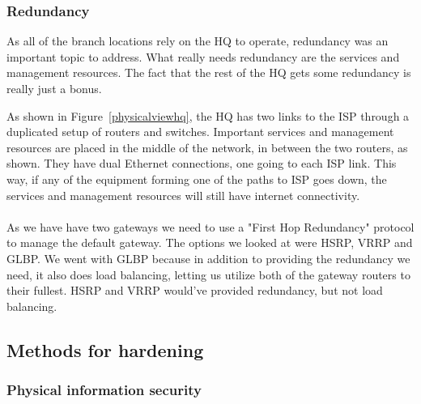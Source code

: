
\subsubsection{Redundancy}

As all of the branch locations rely on the HQ to operate, redundancy was an important topic to address. What really needs redundancy are the services and management resources. The fact that the rest of the HQ gets some redundancy is really just a bonus.

As shown in Figure~\ref{physicalviewhq}, the HQ has two links to the ISP through a duplicated setup of routers and switches. Important services and management resources are placed in the middle of the network, in between the two routers, as shown. They have dual Ethernet connections, one going to each ISP link. This way, if any of the equipment forming one of the paths to ISP goes down, the services and management resources will still have internet connectivity.
\\
\\
As we have have two gateways we need to use a "First Hop Redundancy" protocol to manage the default gateway. The options we looked at were HSRP, VRRP and GLBP. We went with GLBP because in addition to providing the redundancy we need, it also does load balancing, letting us utilize both of the gateway routers to their fullest. HSRP and VRRP would've provided redundancy, but not load balancing.




\subsection{Methods for hardening}

\subsubsection{Physical information security} %



